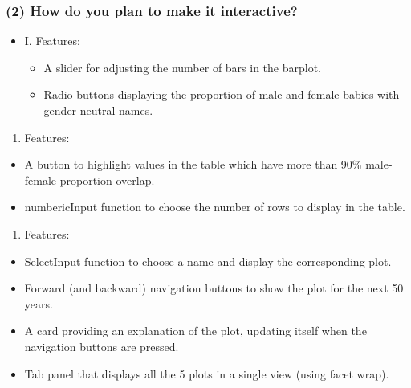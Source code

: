\documentclass[
]{article}
\providecommand{\tightlist}{%
  \setlength{\itemsep}{0pt}\setlength{\parskip}{0pt}}
\begin{document}
\hypertarget{how-do-you-plan-to-make-it-interactive}{%
\subsubsection{(2) How do you plan to make it
interactive?}\label{how-do-you-plan-to-make-it-interactive}}

\begin{itemize}
\tightlist
\item
  I. Features:

  \begin{itemize}
  \tightlist
  \item
    A slider for adjusting the number of bars in the barplot.
  \item
    Radio buttons displaying the proportion of male and female babies
    with gender-neutral names.
  \end{itemize}
\end{itemize}

\begin{enumerate}
\def\labelenumi{\Roman{enumi}.}
\setcounter{enumi}{1}
\tightlist
\item
  Features:
\end{enumerate}

\begin{itemize}
\tightlist
\item
  A button to highlight values in the table which have more than 90\%
  male-female proportion overlap.
\item
  numbericInput function to choose the number of rows to display in the
  table.
\end{itemize}

\begin{enumerate}
\def\labelenumi{\Roman{enumi}.}
\setcounter{enumi}{2}
\tightlist
\item
  Features:
\end{enumerate}

\begin{itemize}
\tightlist
\item
  SelectInput function to choose a name and display the corresponding
  plot.
\item
  Forward (and backward) navigation buttons to show the plot for the
  next 50 years.
\item
  A card providing an explanation of the plot, updating itself when the
  navigation buttons are pressed.
\item
  Tab panel that displays all the 5 plots in a single view (using facet
  wrap).
\end{itemize}
\end{document}
